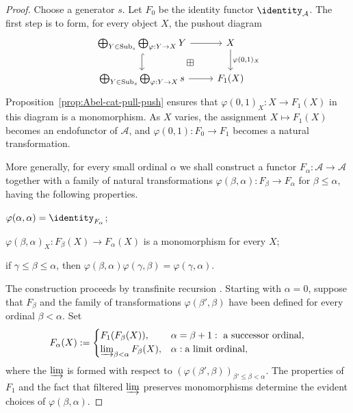 \begin{proof}
	Choose a generator $s$. Let $F_0$ be the identity functor
	$\identity_{\mathcal{A}}$. The first step is to form, for every object $X$,
	the pushout diagram
	\[\begin{tikzcd}
		\bigoplus_{Y \in \mathrm{Sub}_s} \bigoplus_{\varphi: Y \to X} Y \arrow[r] \arrow[hookrightarrow, d] & X \arrow[d, "{\varphi(0, 1)_X}"] \\
		\bigoplus_{Y \in \mathrm{Sub}_s} \bigoplus_{\varphi: Y \to X} s \arrow[r] & F_1(X) \arrow[phantom, lu, "\boxplus" description]
	\end{tikzcd}\]
	Proposition~\ref{prop:Abel-cat-pull-push} ensures that
	$\varphi(0,1)_X:X\to F_1(X)$ in this diagram is a monomorphism. As $X$
	varies, the assignment $X\mapsto F_1(X)$ becomes an endofunctor of
	$\mathcal{A}$, and $\varphi(0,1):F_0\to F_1$ becomes a natural
	transformation.

	More generally, for every small ordinal $\alpha$ we shall construct a
	functor $F_\alpha:\mathcal{A}\to\mathcal{A}$ together with a family of
	natural transformations $\varphi(\beta,\alpha):F_\beta\to F_\alpha$ for
	$\beta\leq\alpha$, having the following properties.
	\begin{compactitem}
		\item $\varphi(\alpha,\alpha)=\identity_{F_\alpha}$;
		\item $\varphi(\beta,\alpha)_X:F_\beta(X)\to F_\alpha(X)$ is a
		monomorphism for every $X$;
		\item if $\gamma\leq\beta\leq\alpha$, then
		$\varphi(\beta,\alpha)\varphi(\gamma,\beta)=\varphi(\gamma,\alpha)$.
	\end{compactitem}
	The construction proceeds by transfinite recursion \cite[\S 1.3]{Li1}.
	Starting with $\alpha=0$, suppose that $F_\beta$ and the family of
	transformations $\varphi(\beta',\beta)$ have been defined for every ordinal
	$\beta<\alpha$. Set
	\[ F_\alpha(X) := \begin{cases}
		F_1(F_\beta(X)), & \alpha = \beta + 1:\ \text{a successor ordinal}, \\
		\varinjlim_{\beta < \alpha} F_\beta(X), & \alpha: \text{a limit ordinal},
	\end{cases}\]
	where the $\varinjlim$ is formed with respect to
	$(\varphi(\beta',\beta))_{\beta'\leq\beta<\alpha}$. The properties of
	$F_1$ and the fact that filtered $\varinjlim$ preserves monomorphisms
	determine the evident choices of $\varphi(\beta,\alpha)$.


\end{proof}
